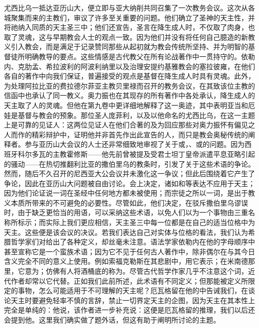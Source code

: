 尤西比乌一抵达亚历山大，便立即与亚大纳削共同召集了一次教务会议。这次从各城聚集而来的主教们，审议了许多至关重要的问题。他们确立了圣神的天主性，并将祂纳入同质的天主圣三中；他们还宣告，圣言在降生成人时，不仅取了肉身，也取了灵魂，这与早期教会人士的观点一致。因为他们并没有将任何自己臆造的新教义引入教会，而是满足于记录赞同那些从起初就为教会传统所坚持、并为明智的基督徒所明确教导的要点。这些情感是古代教父在所有论战著作中一贯持守的。依勒内、克肋孟、希拉波利的阿波利纳里以及治理安提约基雅教会的塞拉彼雍，在他们各自的著作中向我们保证，普遍接受的观点是基督在降生成人时具有灵魂。此外，为处理阿拉比亚的费拉德尔菲亚主教贝里禄而召开的教务会议，在其致该位主教的信函中也承认了同一教义。奥力振也在其现存的所有著作中各处承认，降生成人的天主取了人的灵魂。但他在第九卷中更详细地解释了这一奥迹，其中表明亚当和厄娃是基督与教会的预象。那位圣人庞菲利，以及以他命名的尤西比乌，在这一主题上是可靠的见证人：这两位见证人在他们合著的及为回应那些对奥力振怀有偏见之人而作的精彩辩护中，证明他并非首先作出此宣告的人，而只是教会奥秘传统的阐释者。参与亚历山大会议的人士还非常细致地审视了关于或，、或的问题。因为西班牙科尔多瓦的主教霍修斯——他先前曾被提及受君士坦丁皇帝派遣平息亚略引起的骚动——在热切推翻利比亚的撒伯里乌的教条时，引发了关于这些术语的争论。然而，随后不久召开的尼西亚大公会议并未激化这一争议；但此后围绕着它产生了争论，因此在亚历山大问题被自由讨论。会上决定，诸如和等表达不应用于天主；因为他们论证说一词在圣经中任何地方都未被使用；而宗徒之所以一词，是出于教义本质所带来的不可避免的必要性。尽管如此，他们决定，在驳斥撒伯里乌谬误时，由于缺乏更恰当的用语，可以采纳这些术语，以免人们以为一个事物由三重名称所标示；而实际上我们更应相信，天主圣三中每一位都是在自己的适当位格中为天主。这些便是该会议的决议。若我们表达自己对实体与位格的看法，我们认为希腊哲学家们对给出了各种定义，却丝毫未注意。语法学家依勒内在他的字母顺序中甚至宣称它是一个蛮族术语；因为它不见于任何古人著作中，除非偶尔在与其今日含义完全不同的意义上使用。例如索福克勒斯在其悲剧中，用它表示；在米南德那里，它意为；仿佛有人将酒桶底的称为。尽管古代哲学作家几乎不注意这个词，近代作者却常以它代替。正如我们此前所述，此术语有不同定义；但那能被定义所限定的事物，怎么可能适用于不可理解的天主呢？厄瓦格留在他的中告诫我们，在谈论天主时要避免轻率不慎的言辞，禁止一切界定天主的企图，因为天主在其本性上完全是单纯的：他说，该作者进一步补充说：这便是厄瓦格留的推理，我们以后还会提到他。这里我们确实做了题外话，但这有助于阐明所讨论的主题。\par

